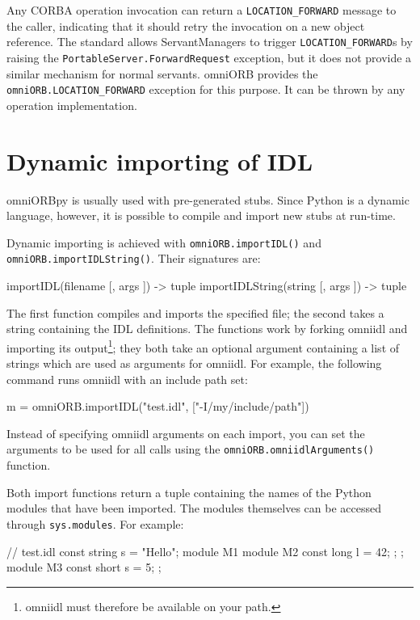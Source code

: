 \documentclass[11pt,twoside,a4paper]{book}
\newcommand{\code}[1]{\texttt{#1}}
\newcommand{\op}[1]{\texttt{#1()}}
\newcommand{\dsc}{\discretionary{}{}{}}
\begin{document}
Any CORBA operation invocation can return a \code{LOCATION\_FORWARD}
message to the caller, indicating that it should retry the invocation
on a new object reference. The standard allows ServantManagers to
trigger \code{LOCATION\_FORWARD}s by raising the
\code{PortableServer.ForwardRequest} exception, but it does not
provide a similar mechanism for normal servants. omniORB provides the
\code{omniORB.\dsc{}LOCATION\_FORWARD} exception for this purpose. It
can be thrown by any operation implementation.



\section{Dynamic importing of IDL}
\label{sec:importIDL}

omniORBpy is usually used with pre-generated stubs. Since Python is a
dynamic language, however, it is possible to compile and import new
stubs at run-time.

Dynamic importing is achieved with \op{omniORB.importIDL} and
\op{omniORB.\dsc{}importIDLString}. Their signatures are:

\begin{pylisting}
importIDL(filename [, args ]) -> tuple
importIDLString(string [, args ]) -> tuple
\end{pylisting}

The first function compiles and imports the specified file; the second
takes a string containing the IDL definitions. The functions work by
forking omniidl and importing its output\footnote{omniidl must
therefore be available on your path.}; they both take an optional
argument containing a list of strings which are used as arguments for
omniidl. For example, the following command runs omniidl with an
include path set:

\begin{pylisting}
m = omniORB.importIDL("test.idl", ["-I/my/include/path"])
\end{pylisting}

\noindent Instead of specifying omniidl arguments on each import, you
can set the arguments to be used for all calls using the
\op{omniORB.omniidlArguments} function.

Both import functions return a tuple containing the names of the
Python modules that have been imported. The modules themselves can be
accessed through \code{sys.modules}. For example:

\begin{idllisting}
// test.idl
const string s = "Hello";
module M1 {
  module M2 {
    const long l = 42;
  };
};
module M3 {
  const short s = 5;
};
\end{idllisting}
\end{document}
